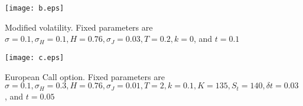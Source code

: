 \documentclass[a4paper,11pt]{amsart}
\numberwithin{equation}{section}
\theoremstyle{definition}
\theoremstyle{plain}
\theoremstyle{definition}
\newcommand{\1}{\mathbf{1}}
\begin{document}
\begin{figure}[H]
  \centering
          \texttt{[image: b.eps]}

  \caption{Modified volatility. Fixed parameters are $\sigma=0.1,\sigma_H=0.1,H=0.76,\sigma_J=0.03,T=0.2,k=0$, and
$t=0.1$}
\label{fig:2}
\end{figure}

\begin{figure}[H]
  \centering
          \texttt{[image: c.eps]}

  \caption{European Call option. Fixed parameters are $\sigma=0.1,\sigma_H=0.3,H=0.76,\sigma_J=0.01,T=2,k=0.1,K=135,S_t=140,\delta t=0.03$, and
$t=0.05$}
\label{fig:3}
\end{figure}
\end{document}
